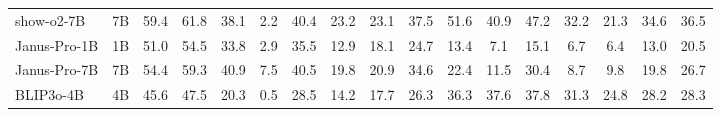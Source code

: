 \begin{table}[t]
{\begin{tabular}{lcccccccccccccccc}
show-o2-7B                       & 7B                                 & 59.4                                 & 61.8                                 & 38.1                                 & 2.2                                  & \cellcolor[HTML]{E2E2E2}40.4                                 & 23.2                                 & 23.1                                 & 37.5                                 & 51.6                                 & 40.9                                 & 47.2                                 & 32.2                                 & 21.3                                 & \cellcolor[HTML]{E2E2E2}34.6                                 & 36.5                                 \\
Janus-Pro-1B                     & 1B                                 & 51.0                                 & 54.5                                 & 33.8                                 & 2.9                                  & \cellcolor[HTML]{E2E2E2}35.5                                 & 12.9                                 & 18.1                                 & 24.7                                 & 13.4                                 & 7.1                                  & 15.1                                 & 6.7                                  & 6.4                                  & \cellcolor[HTML]{E2E2E2}13.0                                 & 20.5                                 \\
Janus-Pro-7B                     & 7B                                 & 54.4                                 & 59.3                                 & 40.9                                 & 7.5                                  & \cellcolor[HTML]{E2E2E2}40.5                                 & 19.8                                 & 20.9                                 & 34.6                                 & 22.4                                 & 11.5                                 & 30.4                                 & 8.7                                  & 9.8                                  & \cellcolor[HTML]{E2E2E2}19.8                                 & 26.7                                 \\
BLIP3o-4B                        & 4B                                 & 45.6                                 & 47.5                                 & 20.3                                 & 0.5                                  & \cellcolor[HTML]{E2E2E2}28.5                                 & 14.2                                 & 17.7                                 & 26.3                                 & 36.3                                 & 37.6                                 & 37.8                                 & 31.3                                 & 24.8                                 & \cellcolor[HTML]{E2E2E2}28.2                                 & 28.3                                 \\

\end{tabular}}
\end{table}
